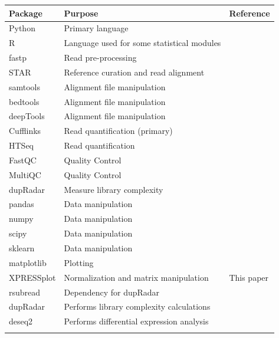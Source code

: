\documentclass[11pt, a4paper, oneside]{article}
\begin{document}
\begin{tabular}{p{2.4cm}p{7.5cm}p{3cm}}
 \textbf{Package} & \textbf{Purpose} & \textbf{Reference} \\
 \hline
 Python & Primary language & \\
 \hline
 R & Language used for some statistical modules & \\
 \hline
 fastp & Read pre-processing & \cite{fastp} \\
 \hline
 STAR & Reference curation and read alignment & \cite{star} \\
 \hline
 samtools & Alignment file manipulation & \cite{samtools} \\
 \hline
 bedtools & Alignment file manipulation & \cite{bedtools} \\
 \hline
 deepTools & Alignment file manipulation & \cite{deeptools} \\
 \hline
 Cufflinks & Read quantification (primary) & \cite{cufflinks} \\
 \hline
 HTSeq & Read quantification & \cite{htseq} \\
 \hline
 FastQC & Quality Control & \cite{fastqc} \\
 \hline
 MultiQC & Quality Control & \cite{multiqc} \\
 \hline
 dupRadar & Measure library complexity & \cite{dupradar} \\
 \hline
 pandas & Data manipulation & \cite{pandas} \\
 \hline
 numpy & Data manipulation & \cite{numpy1, numpy2} \\
 \hline
 scipy & Data manipulation & \cite{scipy} \\
 \hline
 sklearn & Data manipulation & \cite{sklearn} \\
 \hline
 matplotlib & Plotting & \cite{matplotlib} \\
 \hline
 XPRESSplot & Normalization and matrix manipulation & This paper \\
 \hline
 rsubread & Dependency for dupRadar & \cite{rsubread} \\
 \hline
 dupRadar & Performs library complexity calculations & \cite{dupradar} \\
 \hline
 deseq2 & Performs differential expression analysis & \cite{deseq2} \\
 \label{Tab:software_pipe}
\end{tabular}
\newline
\end{document}
